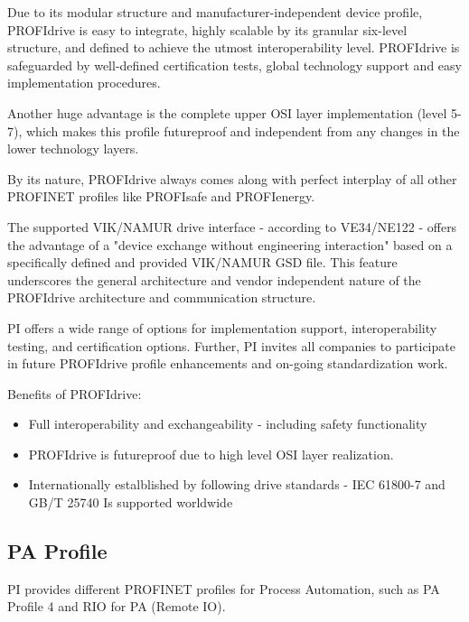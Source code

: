 \documentclass[conference]{IEEEtran}
\begin{document}
Due to its modular structure and manufacturer-independent device profile, PROFIdrive is easy to integrate, highly scalable by its granular six-level structure, and defined to achieve the utmost interoperability level. PROFIdrive is safeguarded by well-defined certification tests, global technology support and easy implementation procedures.
 
Another huge advantage is the complete upper OSI layer implementation (level 5-7), which makes this profile futureproof and independent from any changes in the lower technology layers.

By its nature, PROFIdrive always comes along with perfect interplay of all other PROFINET profiles like PROFIsafe and PROFIenergy.

The supported VIK/NAMUR drive interface - according to VE34/NE122 - offers the advantage of a "device exchange without engineering interaction" based on a specifically defined and provided VIK/NAMUR GSD file. This feature underscores the general architecture and vendor independent nature of the PROFIdrive architecture and communication structure.

PI offers a wide range of options for implementation support, interoperability testing, and certification options. Further, PI invites all companies to participate in future PROFIdrive profile enhancements and on-going standardization work.

Benefits of PROFIdrive:
\begin{itemize}
    \item Full interoperability and exchangeability - including safety functionality
    \item PROFIdrive is futureproof due to high level OSI layer realization.
    \item Internationally estalblished by following drive standards - IEC 61800-7 and GB/T 25740
    \text Is supported worldwide
\end{itemize}

\subsection{PA Profile }
\label{subsec: pAProfile}
PI provides different PROFINET profiles for Process Automation, such as PA Profile 4 and RIO for PA (Remote IO).
\end{document}
